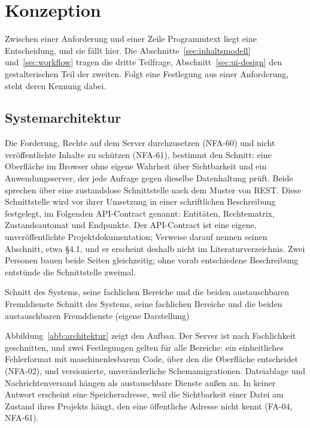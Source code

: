
\chapter{Konzeption}
\label{kap:konzeption}

Zwischen einer Anforderung und einer Zeile Programmtext liegt eine Entscheidung, und sie fällt hier. Die Abschnitte~\ref{sec:inhaltsmodell} und~\ref{sec:workflow} tragen die dritte Teilfrage, Abschnitt~\ref{sec:ui-design} den gestalterischen Teil der zweiten. Folgt eine Festlegung aus einer Anforderung, steht deren Kennung dabei.

\section{Systemarchitektur}
\label{sec:architektur}

Die Forderung, Rechte auf dem Server durchzusetzen (NFA-60) und nicht veröffentlichte Inhalte zu schützen (NFA-61), bestimmt den Schnitt: eine Oberfläche im Browser ohne eigene Wahrheit über Sichtbarkeit und ein Anwendungsserver, der jede Anfrage gegen dieselbe Datenhaltung prüft. Beide sprechen über eine zustandslose Schnittstelle nach dem Muster von REST. Diese Schnittstelle wird vor ihrer Umsetzung in einer schriftlichen Beschreibung festgelegt, im Folgenden API-Contract genannt: Entitäten, Rechtematrix, Zustandsautomat und Endpunkte. Der API-Contract ist eine eigene, unveröffentlichte Projektdokumentation; Verweise darauf nennen seinen Abschnitt, etwa §4.1, und er erscheint deshalb nicht im Literaturverzeichnis. Zwei Personen bauen beide Seiten gleichzeitig; ohne vorab entschiedene Beschreibung entstünde die Schnittstelle zweimal.

%
{Schnitt des Systems, seine fachlichen Bereiche und die beiden austauschbaren Fremddienste}%
{Schnitt des Systems, seine fachlichen Bereiche und die beiden austauschbaren Fremddienste (eigene Darstellung)}

Abbildung~\ref{abb:architektur} zeigt den Aufbau. Der Server ist nach Fachlichkeit geschnitten, und zwei Festlegungen gelten für alle Bereiche: ein einheitliches Fehlerformat mit maschinenlesbarem Code, über den die Oberfläche entscheidet (NFA-02), und versionierte, unveränderliche Schemamigrationen. Dateiablage und Nachrichtenversand hängen als austauschbare Dienste außen an. In keiner Antwort erscheint eine Speicheradresse, weil die Sichtbarkeit einer Datei am Zustand ihres Projekts hängt, den eine öffentliche Adresse nicht kennt (FA-04, NFA-61).

